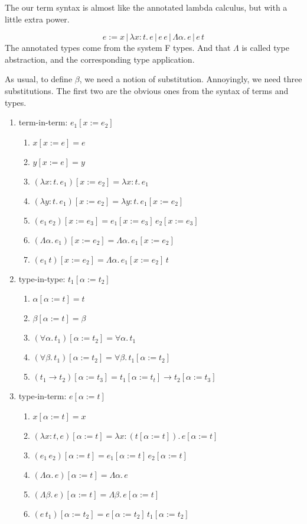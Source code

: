 \documentclass[12pt]{article}
\begin{document}
The our term syntax is almost like the annotated lambda calculus, but with a little extra power.

\[
  e := x \,|\, \lambda x:t.\, e \,|\, e \, e \,|\, \Lambda \alpha.\, e \, | \, e\, t
\]
The annotated types come from the system F types.
And that $\Lambda$ is called type abstraction, and the corresponding type application.

As usual, to define $\beta$, we need a notion of substitution.
Annoyingly, we need three substitutions.
The first two are the obvious ones from the syntax of terms and types.
\begin{enumerate}
    \item term-in-term: $e_1[x:=e_2]$
    \begin{enumerate}
        \item $x[x:=e] = e$
        \item $y[x:=e] = y$
        \item $(\lambda x:t.\,e_1)[x:=e_2] = \lambda x:t.\,e_1$
        \item $(\lambda y:t.\,e_1)[x:=e_2] = \lambda y:t.\,e_1[x:=e_2]$
        \item $(e_1\, e_2)[x:=e_3] = e_1[x:=e_3] \, e_2[x:= e_3]$
        \item $(\Lambda \alpha.\, e_1)[x:=e_2] = \Lambda \alpha.\, e_1[x:=e_2]$
        \item $(e_1\, t)[x:=e_2] = \Lambda \alpha.\, e_1[x:=e_2] \, t$
    \end{enumerate}
    \item type-in-type: $t_1[\alpha:=t_2]$
    \begin{enumerate}
        \item $\alpha [\alpha := t] = t$
        \item $\beta [\alpha := t] = \beta$
        \item $(\forall \alpha.\, t_1) [\alpha := t_2] = \forall \alpha.\, t_1$
        \item $(\forall \beta.\, t_1) [\alpha := t_2] = \forall \beta.\, t_1[\alpha := t_2]$
        \item $(t_1 \rightarrow t_2) [\alpha := t_3] = t_1[\alpha := t_t] \rightarrow t_2[\alpha := t_3]$
    \end{enumerate}
    \item type-in-term: $e[\alpha:= t]$
    \begin{enumerate}
        \item $x[\alpha := t] = x$
        \item $(\lambda x:t, e)[\alpha := t] = \lambda x:(t[\alpha := t]).\, e[\alpha := t]$
        \item $(e_1\,e_2)[\alpha := t] = e_1[\alpha := t]\, e_2[\alpha := t]$
        \item $(\Lambda \alpha.\,e)[\alpha := t] = \Lambda \alpha.\,e$
        \item $(\Lambda \beta.\,e)[\alpha := t] = \Lambda \beta.\,e[\alpha := t]$
        \item $(e\,t_1)[\alpha := t_2] = e[\alpha := t_2]\, t_1[\alpha := t_2]$
    \end{enumerate}
\end{enumerate}
\end{document}
